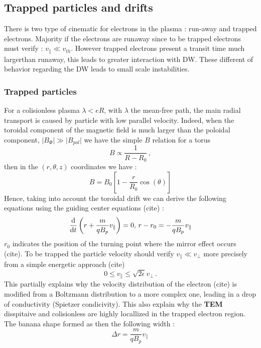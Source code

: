 \documentclass[11pt,a4paper]{report}
\begin{document}
\begin{multicols}{2}
    \subsection{Trapped particles and drifts}
    There is two type of cinematic for electrons in the plasma : run-away and trapped electrons. Majority if the electrons are runaway since to be trapped electrons must verify  : $v_\parallel \ll v_{th}$. However trapped electrons present a transit time much largerthan runaway, this leads to greater interaction with DW.
    These different of behavior regarding the DW leads to small scale instabilities.
    \subsubsection{Trapped particles}
    For a colisionless plasma $\lambda < eR$, with $\lambda$ the mean-free path, the main radial transport is caused by particle with low parallel velocity. Indeed, when the toroidal component of the magnetic field is much larger than the poloidal component, $\vert B_\Phi \vert \gg \vert B_{pol} \vert$ we have the simple $B$ relation for a torus $$B\propto \frac{1}{R-R_0} \, , $$ then in the $(r, \theta, z)$ coordinates we have  :
    $$B = B_0\left[1 - \frac{r}{R_0}\cos(\theta)\right]$$
    Hence, taking into account the toroidal drift we can derive the following equations using the guiding center equations (cite) :
    $$\dv{t}\left( r +\frac{m}{qB_p}v_\parallel\right) = 0 ,\, r - r_0 = -\frac{m}{qB_p}v_\parallel$$
    $r_0$ indicates the position of the turning point where the mirror effect occurs (cite). To be trapped the particle velocity should verify $v_\parallel \ll v_\perp$ more precisely from a simple energetic approach (cite) $$0 \leq v_\parallel \leq \sqrt{2\epsilon} v_\perp \,.$$ This partially explains why the velocity distribution of the electron (cite) is modified from a Boltzmann distribution to a more complex one, leading in a drop of conductivity (Spietzer condicivity). This also explain why the \textbf{TEM} disspitaive and colisionless are highly locallized in the trapped electron region. The banana shape formed as then the following width :
    $$\Delta r = \frac{m}{qB_p}v_\parallel \, $$


\end{multicols}
\end{document}
